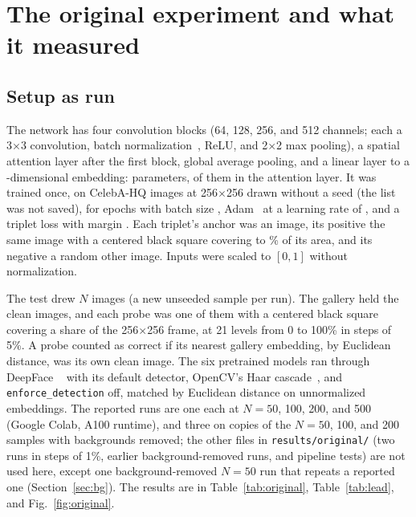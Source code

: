 \section{The original experiment and what it measured}\label{sec:original}

\subsection{Setup as run}

The network has four convolution blocks (64, 128, 256, and 512 channels; each a 3$\times$3 convolution, batch normalization~\cite{ioffe2015batch}, ReLU, and 2$\times$2 max pooling), a spatial attention layer after the first block, global average pooling, and a linear layer to a -dimensional embedding:  parameters,  of them in the attention layer. It was trained once, on  CelebA-HQ images at 256$\times$256 drawn without a seed (the list was not saved), for  epochs with batch size , Adam~\cite{kingma2015adam} at a learning rate of , and a triplet loss with margin . Each triplet's anchor was an image, its positive the same image with a centered black square covering  to \% of its area, and its negative a random other image. Inputs were scaled to $[0,1]$ without normalization.

The test drew $N$ images (a new unseeded sample per run). The gallery held the clean images, and each probe was one of them with a centered black square covering a share of the 256$\times$256 frame, at 21 levels from 0 to 100\% in steps of 5\%. A probe counted as correct if its nearest gallery embedding, by Euclidean distance, was its own clean image. The six pretrained models ran through DeepFace ~\cite{serengil2020lightface,deepface} with its default detector, OpenCV's Haar cascade~\cite{viola2001rapid,bradski2000opencv}, and \texttt{enforce\_detection} off, matched by Euclidean distance on unnormalized embeddings. The reported runs are one each at $N=50$, 100, 200, and 500 (Google Colab, A100 runtime), and three on copies of the $N=50$, 100, and 200 samples with backgrounds removed; the other files in \texttt{results/\allowbreak original/} (two runs in steps of 1\%, earlier background-removed runs, and pipeline tests) are not used here, except one background-removed $N=50$ run that repeats a reported one (Section~\ref{sec:bg}). The results are in Table~\ref{tab:original}, Table~\ref{tab:lead}, and Fig.~\ref{fig:original}.


